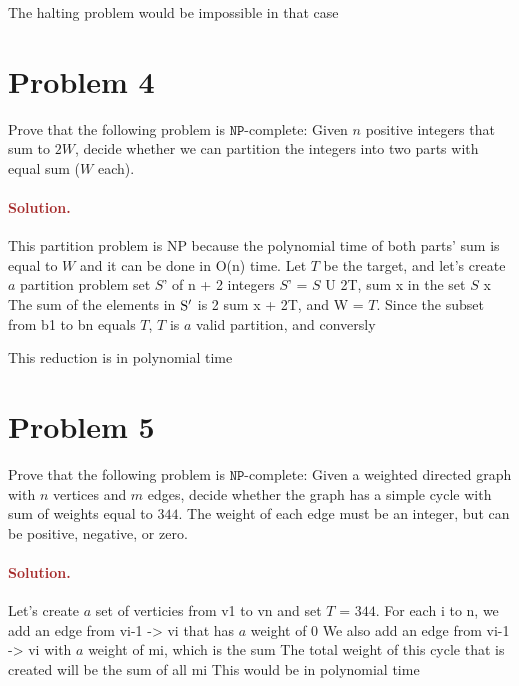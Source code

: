 The halting problem would be impossible in that case



\section*{Problem 4}
Prove that the following problem is $\mathtt{NP}$-complete: Given $n$ positive integers that sum to $2W$, decide whether we can partition the integers into two parts with equal sum ($W$ each).

\paragraph{\textcolor{brown}{Solution.}}
This partition problem is NP because the polynomial time of both parts' sum is equal to $W$ and it can be done in O(n) time.
Let $T$ be the target, and let's create $a$ partition problem set $S$' of n + 2 integers $S$' = $S$ U {2T, sum x in the set $S$ x}
The sum of the elements in \($S$^{\prime }\) is 2 sum x + 2T, and W = $T$.
Since the subset from b1 to bn equals $T$, $T$ is $a$ valid partition, and conversly

This reduction is in polynomial time




\section*{Problem 5}
Prove that the following problem is $\mathtt{NP}$-complete: Given a weighted directed graph with $n$ vertices and $m$ edges, decide whether the graph has a simple cycle with sum of weights equal to $344$. The weight of each edge must be an integer, but can be positive, negative, or zero.

\paragraph{\textcolor{brown}{Solution.}}
Let's create $a$ set of verticies from v1 to vn and set $T$ = $344$. For each i to n, we add an edge from vi-1 -> vi that has $a$ weight of 0
We also add an edge from vi-1 -> vi with $a$ weight of mi, which is the sum
The total weight of this cycle that is created will be the sum of all mi
This would be in polynomial time
